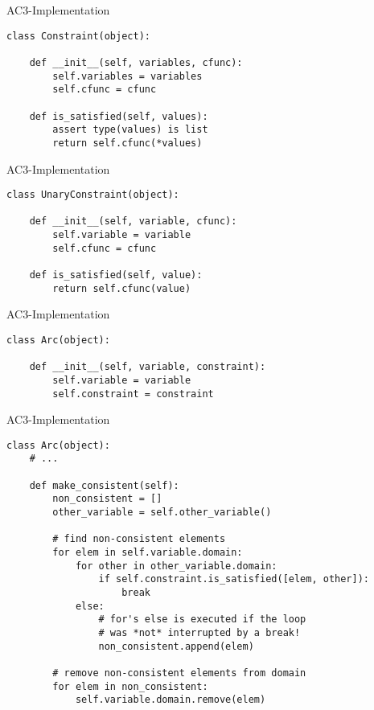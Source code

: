\documentclass[10pt]{beamer}
\begin{document}
\begin{frame}[fragile]{AC3-Implementation}
    \begin{verbatim}
class Constraint(object):

    def __init__(self, variables, cfunc):
        self.variables = variables
        self.cfunc = cfunc

    def is_satisfied(self, values):
        assert type(values) is list
        return self.cfunc(*values)
    \end{verbatim}
\end{frame}

\begin{frame}[fragile]{AC3-Implementation}
    \begin{verbatim}
class UnaryConstraint(object):

    def __init__(self, variable, cfunc):
        self.variable = variable
        self.cfunc = cfunc

    def is_satisfied(self, value):
        return self.cfunc(value)
    \end{verbatim}
\end{frame}

\begin{frame}[fragile]{AC3-Implementation}
    \begin{verbatim}
class Arc(object):

    def __init__(self, variable, constraint):
        self.variable = variable
        self.constraint = constraint
    \end{verbatim}
\end{frame}

\begin{frame}[fragile]{AC3-Implementation}
    \begin{verbatim}
class Arc(object):
    # ...

    def make_consistent(self):
        non_consistent = []
        other_variable = self.other_variable()

        # find non-consistent elements
        for elem in self.variable.domain:
            for other in other_variable.domain:
                if self.constraint.is_satisfied([elem, other]):
                    break
            else:
                # for's else is executed if the loop
                # was *not* interrupted by a break!
                non_consistent.append(elem)

        # remove non-consistent elements from domain
        for elem in non_consistent:
            self.variable.domain.remove(elem)
    \end{verbatim}
\end{frame}
\end{document}

